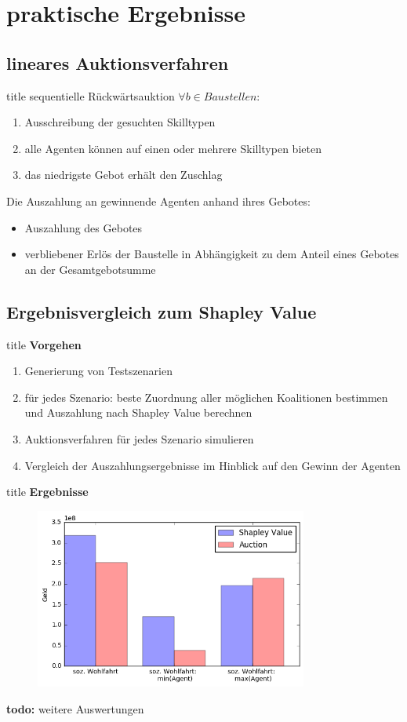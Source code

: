 \documentclass[c]{beamer}
\newcommand\todo[1]{\colorbox{blue!15}{\textbf{todo: }#1}\newline}
\theoremstyle{break}
\begin{document}
  \section*{praktische Ergebnisse}
  \subsection*{lineares Auktionsverfahren}
  \begin{frame}{title}
    sequentielle Rückwärtsauktion $\forall{b \in Baustellen}$:
    \begin{enumerate}
      \item Ausschreibung der gesuchten Skilltypen
      \item alle Agenten können auf einen oder mehrere Skilltypen bieten
      \item das niedrigste Gebot erhält den Zuschlag \\[2em]
    \end{enumerate}

    Die Auszahlung an gewinnende Agenten anhand ihres Gebotes:
    \begin{itemize}
      \item Auszahlung des Gebotes
      \item verbliebener Erlös der Baustelle in Abhängigkeit zu dem Anteil eines Gebotes an der Gesamtgebotsumme
    \end{itemize}
  \end{frame}

  \subsection*{Ergebnisvergleich zum Shapley Value}
  \begin{frame}{title}
    \textbf{Vorgehen}
    \begin{enumerate}
      \item Generierung von Testszenarien
      \item für jedes Szenario: beste Zuordnung aller möglichen Koalitionen bestimmen und Auszahlung nach Shapley Value berechnen
      \item Auktionsverfahren für jedes Szenario simulieren
      \item Vergleich der Auszahlungsergebnisse im Hinblick auf den Gewinn der Agenten
    \end{enumerate}
  \end{frame}

  \begin{frame}{title}
    \textbf{Ergebnisse}
    \begin{figure}
      \centering
      \includegraphics[width=0.8\textwidth]{results.png}
    \end{figure}
    \todo{weitere Auswertungen}
  \end{frame}
\end{document}
